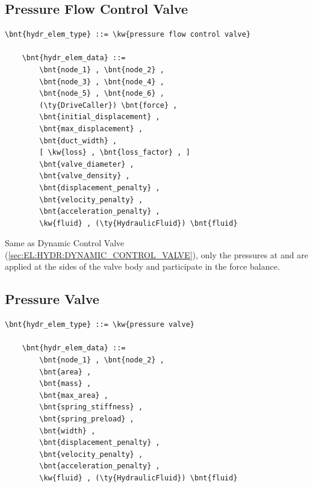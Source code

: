 \subsection{Pressure Flow Control Valve}
\label{sec:EL:HYDR:PRESSURE_FLOW_CONTROL_VALVE}
\begin{Verbatim}[commandchars=\\\{\}]
    \bnt{hydr_elem_type} ::= \kw{pressure flow control valve}

    \bnt{hydr_elem_data} ::=
        \bnt{node_1} , \bnt{node_2} ,
        \bnt{node_3} , \bnt{node_4} ,
        \bnt{node_5} , \bnt{node_6} ,
        (\ty{DriveCaller}) \bnt{force} ,
        \bnt{initial_displacement} ,
        \bnt{max_displacement} ,
        \bnt{duct_width} ,
        [ \kw{loss} , \bnt{loss_factor} , ]
        \bnt{valve_diameter} ,
        \bnt{valve_density} ,
        \bnt{displacement_penalty} ,
        \bnt{velocity_penalty} ,
        \bnt{acceleration_penalty} ,
        \kw{fluid} , (\ty{HydraulicFluid}) \bnt{fluid}
\end{Verbatim}
Same as Dynamic Control Valve (\ref{sec:EL:HYDR:DYNAMIC_CONTROL_VALVE}),
only the pressures at  and  are applied
at the sides of the valve body and participate in the force balance.



\subsection{Pressure Valve}
\label{sec:EL:HYDR:PRESSURE_VALVE}
\begin{Verbatim}[commandchars=\\\{\}]
    \bnt{hydr_elem_type} ::= \kw{pressure valve}

    \bnt{hydr_elem_data} ::=
        \bnt{node_1} , \bnt{node_2} ,
        \bnt{area} ,
        \bnt{mass} ,
        \bnt{max_area} ,
        \bnt{spring_stiffness} ,
        \bnt{spring_preload} ,
        \bnt{width} ,
        \bnt{displacement_penalty} ,
        \bnt{velocity_penalty} ,
        \bnt{acceleration_penalty} ,
        \kw{fluid} , (\ty{HydraulicFluid}) \bnt{fluid}
\end{Verbatim}

